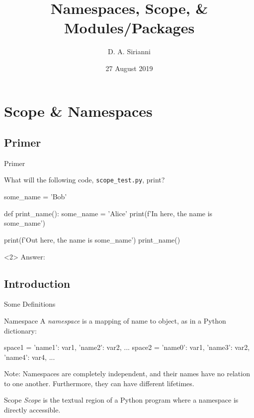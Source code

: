 \documentclass[11pt,table]{beamer}
\title[8/27: Advanced Python]{Namespaces, Scope, \&\\
Modules/Packages}
\author[D. A. Sirianni]{D. A. Sirianni}
\institute[GT Chemistry]{CHEM 4803/8843 DR\\$\,$\\
School of Chemistry \& Biochemistry\\ 
Georgia Institute of Technology}
\date{27 August 2019}
\begin{document}
\GTtitleframe
\frontTOC


\section{Scope \& Namespaces}
\subsection{Primer}
\begin{frame}[fragile]{Primer}

What will the following code, {\tt scope\_test.py}, print?
\begin{mintypython}
some_name = 'Bob'

def print_name():
    some_name = 'Alice'
    print(f'In here, the name is {some_name}')

print(f'Out here, the name is {some_name}')
print_name()
\end{mintypython}

\begin{onlyenv}<2>
Answer:
\end{onlyenv}

\end{frame}

\subsection{Introduction}
\begin{frame}[fragile]{Some Definitions}

\begin{block}{Namespace}
A {\em namespace} is a mapping of name to object, as in a Python dictionary:
\begin{mintypython}
space1 = {'name1': var1, 'name2': var2, ...}
space2 = {'name0': var1, 'name3': var2, 'name4': var4, ...}
\end{mintypython}
Note: Namespaces are completely independent, and their names have no relation
to one another.  Furthermore, they can have different lifetimes.
\end{block}

\begin{block}{Scope}
{\em Scope} is the textual region of a Python program where a namespace is
directly accessible.
\end{block}

\end{frame}
\end{document}
